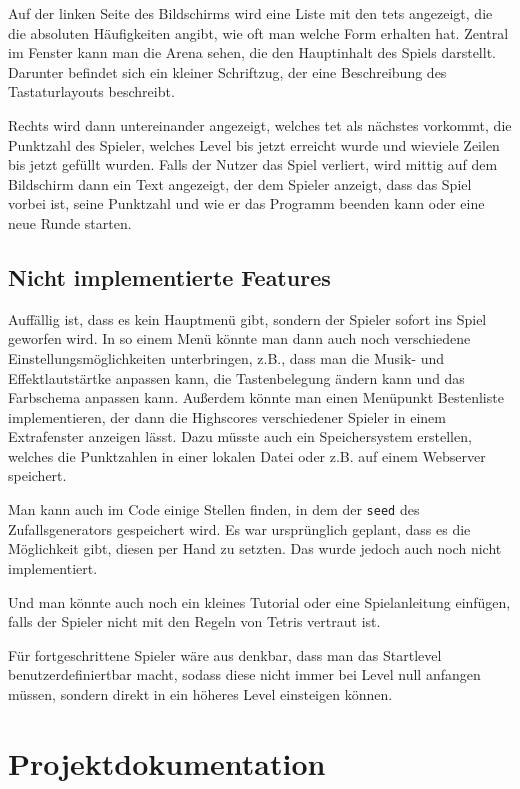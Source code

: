 \documentclass[11pt]{article}
\newcommand{\lstin}[1]{\lstinline[language=C]{#1}}
\begin{document}
Auf der linken Seite des Bildschirms wird eine Liste mit den \glspl{tet} angezeigt, die die absoluten Häufigkeiten angibt, 
wie oft man welche Form erhalten hat. 
Zentral im Fenster kann man die Arena sehen, die den Hauptinhalt des Spiels darstellt. Darunter befindet sich ein kleiner Schriftzug, der eine Beschreibung des Tastaturlayouts beschreibt.

Rechts wird dann untereinander angezeigt, welches \gls{tet} als nächstes vorkommt, die Punktzahl des Spieler, welches Level bis jetzt erreicht wurde und wieviele Zeilen bis jetzt gefüllt wurden.
Falls der Nutzer das Spiel verliert, wird mittig auf dem Bildschirm dann ein Text angezeigt, der dem Spieler anzeigt, dass das Spiel vorbei ist, seine Punktzahl und wie
er das Programm beenden kann oder eine neue Runde starten.

\subsection{Nicht implementierte Features} \label{uif}

Auffällig ist, dass es kein Hauptmenü gibt, sondern der Spieler sofort ins Spiel geworfen wird. 
In so einem Menü könnte man dann auch noch verschiedene Einstellungsmöglichkeiten unterbringen, z.B., 
dass man die Musik- und Effektlautstärtke anpassen kann, die Tastenbelegung ändern kann und das Farbschema anpassen kann.
Außerdem könnte man einen Menüpunkt Bestenliste implementieren, der dann die Highscores verschiedener Spieler in einem Extrafenster anzeigen lässt.
Dazu müsste auch ein Speichersystem erstellen, welches die Punktzahlen in einer lokalen Datei oder z.B. auf einem Webserver speichert.

Man kann auch im Code einige Stellen finden, in dem der \lstin{seed} des Zufallsgenerators gespeichert wird. Es war ursprünglich geplant, 
dass es die Möglichkeit gibt, diesen per Hand zu setzten. Das wurde jedoch auch noch nicht implementiert.

Und man könnte auch noch ein kleines Tutorial oder eine Spielanleitung einfügen, falls der Spieler nicht mit den Regeln von Tetris vertraut ist.

Für fortgeschrittene Spieler wäre aus denkbar, dass man das Startlevel benutzerdefiniertbar macht, sodass diese nicht immer bei Level null anfangen müssen,
sondern direkt in ein höheres Level einsteigen können.
\pagebreak

\section{Projektdokumentation}
\end{document}
